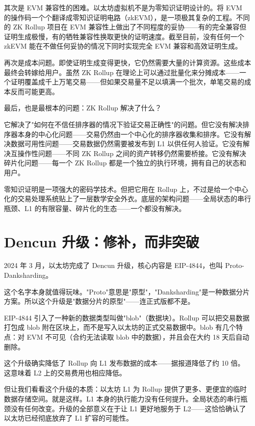 \documentclass[a4paper,12pt,openany]{ctexbook}
\begin{document}
其次是 EVM 兼容性的困难。以太坊虚拟机不是为零知识证明设计的。将 EVM 的操作码一个个翻译成零知识证明电路（zkEVM），是一项极其复杂的工程。不同的 ZK Rollup 项目在 EVM 兼容性上做出了不同程度的妥协——有的完全兼容但证明生成极慢，有的牺牲兼容性换取更快的证明速度。截至目前，没有任何一个 zkEVM 能在不做任何妥协的情况下同时实现完全 EVM 兼容和高效证明生成。

再次是成本问题。即使证明生成变得更快，它仍然需要大量的计算资源。这些成本最终会转嫁给用户。虽然 ZK Rollup 在理论上可以通过批量化来分摊成本——一个证明覆盖成千上万笔交易——但如果交易量不足以填满一个批次，单笔交易的成本反而可能更高。

最后，也是最根本的问题：ZK Rollup 解决了什么？

它解决了"如何在不信任排序器的情况下验证交易正确性"的问题。但它没有解决排序器本身的中心化问题——交易仍然由一个中心化的排序器收集和排序。它没有解决数据可用性问题——交易数据仍然需要被发布到 L1 以供任何人验证。它没有解决互操作性问题——不同 ZK Rollup 之间的资产转移仍然需要桥接。它没有解决碎片化问题——每一个 ZK Rollup 都是一个独立的执行环境，拥有自己的状态和用户。

零知识证明是一项强大的密码学技术。但把它用在 Rollup 上，不过是给一个中心化的交易处理系统贴上了一层数学安全外衣。底层的架构问题——全局状态的串行瓶颈、L1 的有限容量、碎片化的生态——一个都没有解决。


\section*{Dencun 升级：修补，而非突破}


2024 年 3 月，以太坊完成了 Dencun 升级，核心内容是 EIP-4844，也叫 Proto-Danksharding。

这个名字本身就值得玩味。"Proto"意思是"原型"，"Danksharding"是一种数据分片方案。所以这个升级是"数据分片的原型"——连正式版都不是。

EIP-4844 引入了一种新的数据类型叫做"blob"（数据块）。Rollup 可以把交易数据打包成 blob 附在区块上，而不是写入以太坊的正式交易数据中。blob 有几个特点：对 EVM 不可见（合约无法读取 blob 中的数据），并且会在大约 18 天后自动删除。

这个升级确实降低了 Rollup 向 L1 发布数据的成本——据报道降低了约 10 倍。这意味着 L2 上的交易费用也相应降低。

但让我们看看这个升级的本质：以太坊 L1 为 Rollup 提供了更多、更便宜的临时数据存储空间。就是这样。L1 本身的执行能力没有任何提升。全局状态的串行瓶颈没有任何改变。升级的全部意义在于让 L1 更好地服务于 L2——这恰恰确认了以太坊已经彻底放弃了 L1 扩容的可能性。
\end{document}
